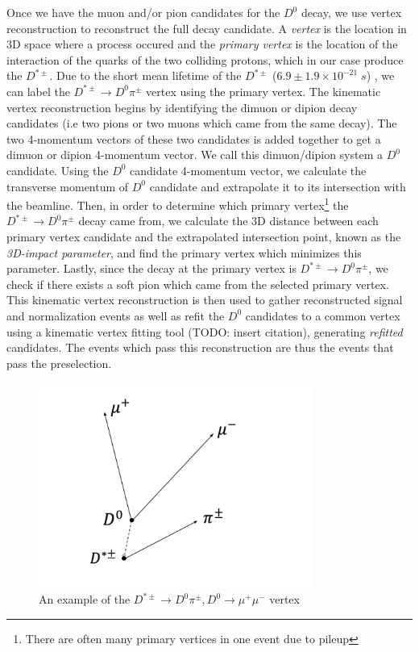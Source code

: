 Once we have the muon and/or pion candidates for the $D^0$ decay, we use vertex reconstruction to reconstruct the full decay candidate. A \textit{vertex} is the location in 3D space where a process occured and the \textit{primary vertex} is the location of the interaction of the quarks of the two colliding protons, which in our case produce the $D^{*\pm}$. Due to the short mean lifetime of the $D^{*\pm}$ ($ 6.9 \pm 1.9 \times 10^{-21} \; s$) \cite{ref:pdg2024}, we can label the $D^{*\pm} \to D^0 \pi^\pm$ vertex using the primary vertex. The kinematic vertex reconstruction begins by identifying the dimuon or dipion decay candidates (i.e two pions or two muons which came from the same decay). The two 4-momentum vectors of these two candidates is added together to get a dimuon or dipion 4-momentum vector. We call this dimuon/dipion system a $D^0$ candidate. Using the $D^0$ candidate 4-momentum vector, we calculate the transverse momentum of $D^0$ candidate and extrapolate it to its intersection with the beamline. Then, in order to determine which primary vertex\footnote{There are often many primary vertices in one event due to pileup} the $D^{*\pm} \to D^0 \pi^\pm$ decay came from, we calculate the 3D distance between each primary vertex candidate and the extrapolated intersection point, known as the \textit{3D-impact parameter}, and find the primary vertex which minimizes this parameter. Lastly, since the decay at the primary vertex is $D^{*\pm} \to D^0 \pi^\pm$, we check if there exists a soft pion which came from the selected primary vertex. This kinematic vertex reconstruction is then used to gather reconstructed signal and normalization events as well as refit the $D^0$ candidates to a common vertex using a kinematic vertex fitting tool (TODO: insert citation), generating \textit{refitted} candidates. The events which pass this reconstruction are thus the events that pass the preselection. 

\begin{figure}[htbp]
    \centering
    \includegraphics[width=0.8\textwidth]{figures/chapter4/vertex_reconstruction.png}
    \caption{An example of the $D^{*\pm} \to D^0 \pi^\pm, D^0 \to \mu^+ \mu^-$ vertex}
    \label{fig:vertex_reconstruction}
\end{figure}

